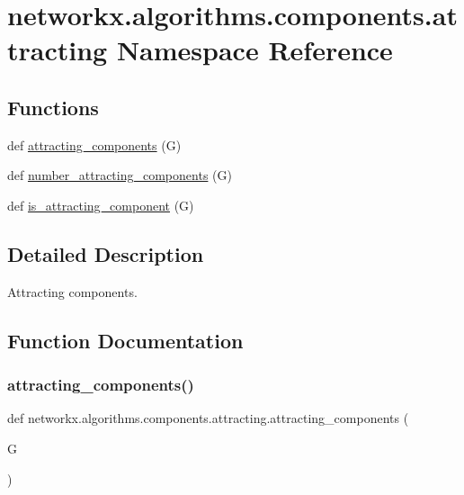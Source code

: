 \hypertarget{namespacenetworkx_1_1algorithms_1_1components_1_1attracting}{}\section{networkx.\+algorithms.\+components.\+attracting Namespace Reference}
\label{namespacenetworkx_1_1algorithms_1_1components_1_1attracting}
\subsection*{Functions}
\begin{DoxyCompactItemize}
\item 
def \hyperlink{namespacenetworkx_1_1algorithms_1_1components_1_1attracting_ad6c864d76a475b2d6240129957204545}{attracting\+\_\+components} (G)
\item 
def \hyperlink{namespacenetworkx_1_1algorithms_1_1components_1_1attracting_a7cacb51a9a3367f342f1adb8ce1e6ce3}{number\+\_\+attracting\+\_\+components} (G)
\item 
def \hyperlink{namespacenetworkx_1_1algorithms_1_1components_1_1attracting_a0fa6754e8f2554b88b948fea54b82b15}{is\+\_\+attracting\+\_\+component} (G)
\end{DoxyCompactItemize}


\subsection{Detailed Description}
\begin{DoxyVerb}Attracting components.\end{DoxyVerb}
 

\subsection{Function Documentation}
\mbox{\label{namespacenetworkx_1_1algorithms_1_1components_1_1attracting_ad6c864d76a475b2d6240129957204545}} 
\subsubsection{\texorpdfstring{attracting\+\_\+components()}{attracting\_components()}}
{\footnotesize\ttfamily def networkx.\+algorithms.\+components.\+attracting.\+attracting\+\_\+components (\begin{DoxyParamCaption}\item[{}]{G }\end{DoxyParamCaption})}

